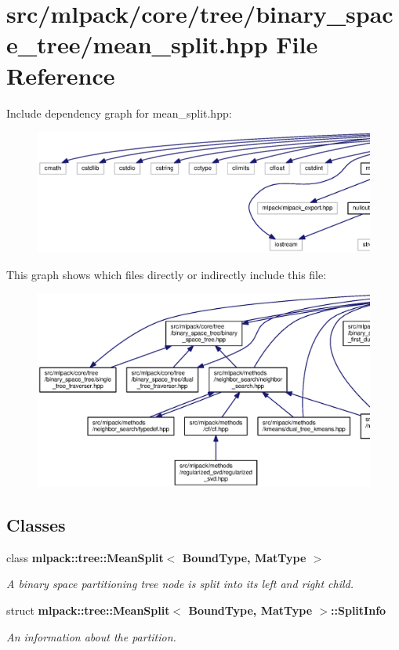 \section{src/mlpack/core/tree/binary\+\_\+space\+\_\+tree/mean\+\_\+split.hpp File Reference}
\label{mean__split_8hpp}
Include dependency graph for mean\+\_\+split.\+hpp\+:
\nopagebreak
\begin{figure}[H]
\begin{center}
\leavevmode
\includegraphics[width=350pt]{mean__split_8hpp__incl}
\end{center}
\end{figure}
This graph shows which files directly or indirectly include this file\+:
\nopagebreak
\begin{figure}[H]
\begin{center}
\leavevmode
\includegraphics[width=350pt]{mean__split_8hpp__dep__incl}
\end{center}
\end{figure}
\subsection*{Classes}
\begin{DoxyCompactItemize}
\item 
class {\bf mlpack\+::tree\+::\+Mean\+Split$<$ Bound\+Type, Mat\+Type $>$}
\begin{DoxyCompactList}\small\item\em A binary space partitioning tree node is split into its left and right child. \end{DoxyCompactList}\item 
struct {\bf mlpack\+::tree\+::\+Mean\+Split$<$ Bound\+Type, Mat\+Type $>$\+::\+Split\+Info}
\begin{DoxyCompactList}\small\item\em An information about the partition. \end{DoxyCompactList}\end{DoxyCompactItemize}
